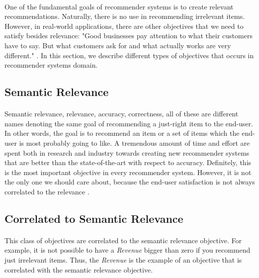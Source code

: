 \documentclass[letterpaper]{article}
\begin{document}
\paragraph{}

One of the fundamental goals of recommender systems is to create relevant recommendations. Naturally, there is no use in recommending irrelevant items. However, in real-world applications, there are other objectives that we need to satisfy besides relevance: "Good businesses pay attention to what their customers have to say. But what customers ask for and what actually works are very different." \cite{Gomez-Uribe:2015:NRS:2869770.2843948}. In this section, we describe different types of objectives that occurs in recommender systems domain.

\subsection{Semantic Relevance}
\paragraph{}

Semantic relevance, relevance, accuracy, correctness, all of these are different names denoting the same goal of recommending a just-right item to the end-user. In other words, the goal is to recommend an item or a set of items which the end-user is most probably going to like. A tremendous amount of time and effort are spent both in research and industry towards creating new recommender systems that are better than the state-of-the-art with respect to accuracy. Definitely, this is the most important objective in every recommender system. However, it is not the only one we should care about, because the end-user satisfaction is not always correlated to the relevance \cite{Being_Accurate_not_enough}.

\subsection{Correlated to Semantic Relevance}
\paragraph{}

This class of objectives are correlated to the semantic relevance objective. For example, it is not possible to have a \textit{Revenue} bigger than zero if you recommend just irrelevant items. Thus, the \textit{Revenue} is the example of an objective that is correlated with the semantic relevance objective.
\end{document}

